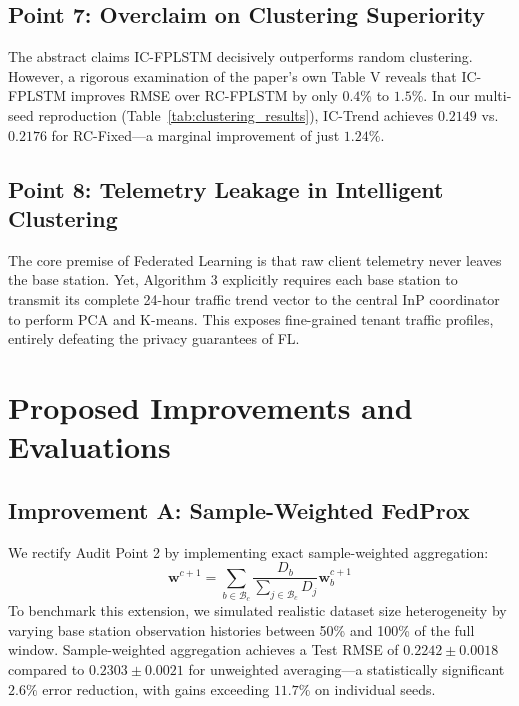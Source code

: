 \documentclass[10pt,journal,compsoc,twocolumn]{article}
\begin{document}
\subsection{Point 7: Overclaim on Clustering Superiority}
The abstract claims IC-FPLSTM decisively outperforms random clustering. However, a rigorous examination of the paper's own Table V reveals that IC-FPLSTM improves RMSE over RC-FPLSTM by only $0.4\%$ to $1.5\%$. In our multi-seed reproduction (Table~\ref{tab:clustering_results}), IC-Trend achieves $0.2149$ vs. $0.2176$ for RC-Fixed—a marginal improvement of just $1.24\%$.

\subsection{Point 8: Telemetry Leakage in Intelligent Clustering}
The core premise of Federated Learning is that raw client telemetry never leaves the base station. Yet, Algorithm 3 explicitly requires each base station to transmit its complete 24-hour traffic trend vector to the central InP coordinator to perform PCA and K-means. This exposes fine-grained tenant traffic profiles, entirely defeating the privacy guarantees of FL.

\section{Proposed Improvements and Evaluations}

\subsection{Improvement A: Sample-Weighted FedProx}
We rectify Audit Point 2 by implementing exact sample-weighted aggregation:
\begin{equation}
    \mathbf{w}^{c+1} = \sum_{b \in \mathcal{B}_c} \frac{D_b}{\sum_{j \in \mathcal{B}_c} D_j} \mathbf{w}_b^{c+1}
\end{equation}
To benchmark this extension, we simulated realistic dataset size heterogeneity by varying base station observation histories between 50\% and 100\% of the full window. Sample-weighted aggregation achieves a Test RMSE of $0.2242 \pm 0.0018$ compared to $0.2303 \pm 0.0021$ for unweighted averaging—a statistically significant $2.6\%$ error reduction, with gains exceeding $11.7\%$ on individual seeds.
\end{document}
